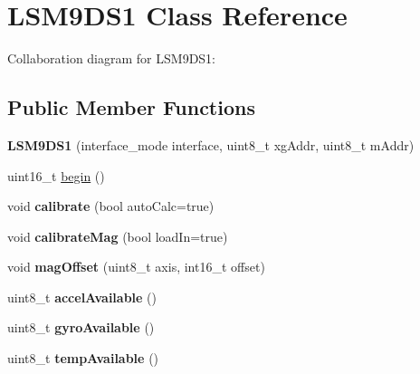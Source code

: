 \hypertarget{classLSM9DS1}{}\section{L\+S\+M9\+D\+S1 Class Reference}
\label{classLSM9DS1}


Collaboration diagram for L\+S\+M9\+D\+S1\+:
\subsection*{Public Member Functions}
\begin{DoxyCompactItemize}
\item 
{\bfseries L\+S\+M9\+D\+S1} (interface\+\_\+mode interface, uint8\+\_\+t xg\+Addr, uint8\+\_\+t m\+Addr)\hypertarget{classLSM9DS1_ab62923063ffc49dca82e6f311c5c8764}{}\label{classLSM9DS1_ab62923063ffc49dca82e6f311c5c8764}

\item 
uint16\+\_\+t \hyperlink{classLSM9DS1_a8728e560c76bd120b3711af15a6ecbd6}{begin} ()
\item 
void {\bfseries calibrate} (bool auto\+Calc=true)\hypertarget{classLSM9DS1_a97939cb15fcb7e33abcd6d3a9230d943}{}\label{classLSM9DS1_a97939cb15fcb7e33abcd6d3a9230d943}

\item 
void {\bfseries calibrate\+Mag} (bool load\+In=true)\hypertarget{classLSM9DS1_afb45f0bcbcbeb15d4bd1a28821b24d14}{}\label{classLSM9DS1_afb45f0bcbcbeb15d4bd1a28821b24d14}

\item 
void {\bfseries mag\+Offset} (uint8\+\_\+t axis, int16\+\_\+t offset)\hypertarget{classLSM9DS1_a0d461614bd058b082c94481dc916c18b}{}\label{classLSM9DS1_a0d461614bd058b082c94481dc916c18b}

\item 
uint8\+\_\+t {\bfseries accel\+Available} ()\hypertarget{classLSM9DS1_a515ce6f5c199a86c6aa5be353b2a3a13}{}\label{classLSM9DS1_a515ce6f5c199a86c6aa5be353b2a3a13}

\item 
uint8\+\_\+t {\bfseries gyro\+Available} ()\hypertarget{classLSM9DS1_a65b71a03a30f4e8ed1ffd46de3db0560}{}\label{classLSM9DS1_a65b71a03a30f4e8ed1ffd46de3db0560}

\item 
uint8\+\_\+t {\bfseries temp\+Available} ()\hypertarget{classLSM9DS1_aaf6683c6f3f0281d5222b74f580f321b}{}\label{classLSM9DS1_aaf6683c6f3f0281d5222b74f580f321b}


\end{DoxyCompactItemize}
